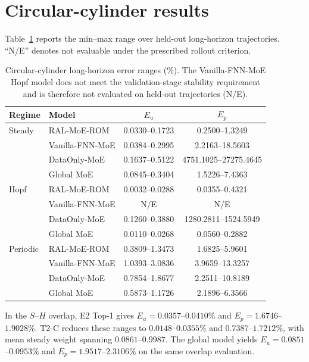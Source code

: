 \section{Circular-cylinder results}
\label{app:circular}

Table~\ref{tab:circular_full} reports the min--max range over held-out long-horizon trajectories. ``N/E'' denotes not evaluable under the prescribed rollout criterion.

\begin{table}[h]
\centering
\caption{Circular-cylinder long-horizon error ranges (\%). The Vanilla-FNN-MoE
Hopf model does not meet the validation-stage stability requirement and is
therefore not evaluated on held-out trajectories (N/E).}
\label{tab:circular_full}
\small
\setlength{\tabcolsep}{4pt}
\begin{tabular}{llcc}
\toprule
Regime & Model & $E_u$ & $E_p$ \\
\midrule
Steady & RAL-MoE-ROM & 0.0330--0.1723 & 0.2500--1.3249 \\
 & Vanilla-FNN-MoE & 0.0384--0.2995 & 2.2163--18.5603 \\
 & DataOnly-MoE & 0.1637--0.5122 & 4751.1025--27275.4645 \\
 & Global MoE & 0.0845--0.3404 & 1.5226--7.4363 \\
\midrule
Hopf & RAL-MoE-ROM & 0.0032--0.0288 & 0.0355--0.4321 \\
 & Vanilla-FNN-MoE & N/E & N/E \\
 & DataOnly-MoE & 0.1260--0.3880 & 1280.2811--1524.5949 \\
 & Global MoE & 0.0110--0.0268 & 0.0560--0.2882 \\
\midrule
Periodic & RAL-MoE-ROM & 0.3809--1.3473 & 1.6825--5.9601 \\
 & Vanilla-FNN-MoE & 1.0393--3.0836 & 3.9659--13.3257 \\
 & DataOnly-MoE & 0.7854--1.8677 & 2.2511--10.8189 \\
 & Global MoE & 0.5873--1.1726 & 2.1896--6.3566 \\
\bottomrule
\end{tabular}
\end{table}

In the $S$--$H$ overlap, E2 Top-1 gives $E_u=0.0357$--$0.0410\%$ and $E_p=1.6746$--$1.9028\%$. T2-C reduces these ranges to $0.0148$--$0.0355\%$ and $0.7387$--$1.7212\%$, with mean steady weight spanning $0.0861$--$0.9987$. The global model yields $E_u=0.0851$--$0.0953\%$ and $E_p=1.9517$--$2.3106\%$ on the same overlap evaluation.
